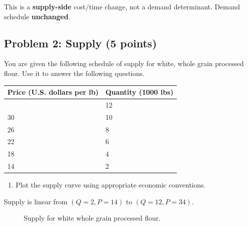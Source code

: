 \documentclass[
  letterpaper,
  DIV=11,
  numbers=noendperiod]{scrartcl}
\providecommand{\tightlist}{%
  \setlength{\itemsep}{0pt}\setlength{\parskip}{0pt}}
\begin{document}
This is a \textbf{supply-side} cost/time change, not a demand
determinant. Demand schedule \textbf{unchanged}.

\subsection{Problem 2: Supply (5
points)}\label{problem-2-supply-5-points}

You are given the following schedule of supply for white, whole grain
processed flour. Use it to answer the following questions.

\begin{longtable}[]{@{}ll@{}}
\toprule\noalign{}
Price (U.S. dollars per lb) & Quantity (1000 lbs) \\
\midrule\noalign{}
\endhead
\bottomrule\noalign{}
\endlastfoot
34 & 12 \\
30 & 10 \\
26 & 8 \\
22 & 6 \\
18 & 4 \\
14 & 2 \\
\end{longtable}

\begin{enumerate}
\def\labelenumi{\alph{enumi}.}
\tightlist
\item
  Plot the supply curve using appropriate economic conventions.
\end{enumerate}

Supply is linear from \((Q=2, P=14)\) to \((Q=12, P=34)\).

\begin{figure}[h]
\centering
{}
\caption{Supply for white whole grain processed flour.}
\end{figure}
\end{document}
